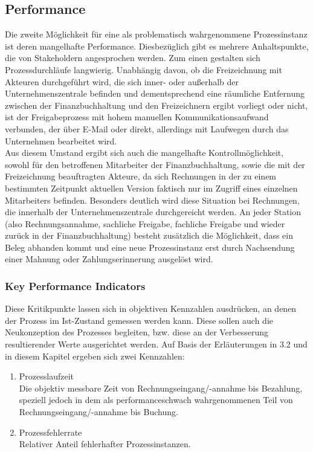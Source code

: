 \subsection{Performance}
Die zweite Möglichkeit für eine als problematisch wahrgenommene Prozessinstanz ist deren mangelhafte Performance.
Diesbezüglich gibt es mehrere Anhaltspunkte, die von Stakeholdern angesprochen werden.
Zum einen gestalten sich Prozessdurchläufe langwierig.
Unabhängig davon, ob die Freizeichnung mit Akteuren durchgeführt wird, die sich inner- oder außerhalb der Unternehmenszentrale befinden und dementsprechend eine räumliche Entfernung zwischen der Finanzbuchhaltung und den Freizeichnern ergibt vorliegt oder nicht, ist der Freigabeprozess mit hohem manuellen Kommunikationsaufwand verbunden, der über E-Mail oder direkt, allerdings mit Laufwegen durch das Unternehmen bearbeitet wird.
\\
Aus diesem Umstand ergibt sich auch die mangelhafte Kontrollmöglichkeit, sowohl für den betroffenen Mitarbeiter der Finanzbuchhaltung, sowie die mit der Freizeichnung beauftragten Akteure, da sich Rechnungen in der zu einem bestimmten Zeitpunkt aktuellen Version faktisch nur im Zugriff eines einzelnen Mitarbeiters befinden. 
Besonders deutlich wird diese Situation bei Rechnungen, die innerhalb der Unternehmenszentrale durchgereicht werden.
An jeder Station (also Rechnungsannahme, sachliche Freigabe, fachliche Freigabe und wieder zurück in der Finanzbuchhaltung) besteht zusätzlich die Möglichkeit, dass ein Beleg abhanden kommt und eine neue Prozessinstanz erst durch Nachsendung einer Mahnung oder Zahlungserinnerung ausgelöst wird.

\subsubsection{Key Performance Indicators}
Diese Kritikpunkte lassen sich in objektiven Kennzahlen ausdrücken, an denen der Prozess im Ist-Zustand gemessen werden kann. 
Diese sollen auch die Neukonzeption des Prozesses begleiten, bzw. diese an der Verbesserung resultierender Werte ausgerichtet werden.
Auf Basis der Erläuterungen in 3.2 und in diesem Kapitel ergeben sich zwei Kennzahlen:

\begin{enumerate}
\item{Prozesslaufzeit}
\\ Die objektiv messbare Zeit von Rechnungseingang/-annahme bis Bezahlung, speziell jedoch in dem als performanceschwach wahrgenommenen Teil von Rechnungseingang/-annahme bis Buchung.
\item{Prozessfehlerrate}
\\ Relativer Anteil fehlerhafter Prozessinstanzen.
\end{enumerate}




